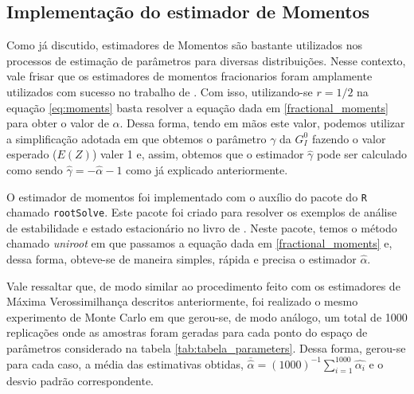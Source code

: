 \documentclass[12pt]{article}
\begin{document}
\subsection{Implementação do estimador de Momentos}

Como já discutido, estimadores de Momentos são bastante utilizados nos processos de estimação de parâmetros para diversas distribuições. Nesse contexto, vale frisar que os estimadores de momentos fracionarios foram amplamente utilizados com sucesso no trabalho de \citet{Clutter1997}. Com isso, utilizando-se $r = 1/2$ na equação \eqref{eq:moments} basta resolver a equação dada em \eqref{fractional_moments} para obter o valor de $\hat{\alpha}$. Dessa forma, tendo em mãos este valor, podemos utilizar a simplificação adotada em que obtemos o parâmetro $\gamma$ da $G_I^0$ fazendo o valor esperado ($E(Z)$) valer 1 e, assim, obtemos que o estimador $\hat{\gamma}$ pode ser calculado como sendo $\hat{\gamma} = -\hat{\alpha} - 1$ como já explicado anteriormente.

O estimador de momentos foi implementado com o auxílio do pacote do \texttt{R} chamado \texttt{rootSolve}. Este pacote foi criado para resolver os exemplos de análise de estabilidade e estado estacionário no livro de \citet{Soetaert2009}. Neste pacote, temos o método chamado \textit{uniroot} em que passamos a equação dada em \eqref{fractional_moments} e, dessa forma, obteve-se de maneira simples, rápida e precisa o estimador $\hat{\alpha}$.

Vale ressaltar que, de modo similar ao procedimento feito com os estimadores de Máxima Verossimilhança descritos anteriormente, foi realizado o mesmo experimento de Monte Carlo em que gerou-se, de modo análogo, um total de 1000 replicações onde as amostras foram geradas para cada ponto do espaço de parâmetros considerado na tabela \ref{tab:tabela_parameters}. Dessa forma, gerou-se para cada caso, a média das estimativas obtidas, $\overline{\hat{\alpha}} = (1000)^{-1} \sum_{i=1}^{1000} \hat{\alpha_{i}}$ e o desvio padrão correspondente. 
\end{document}
